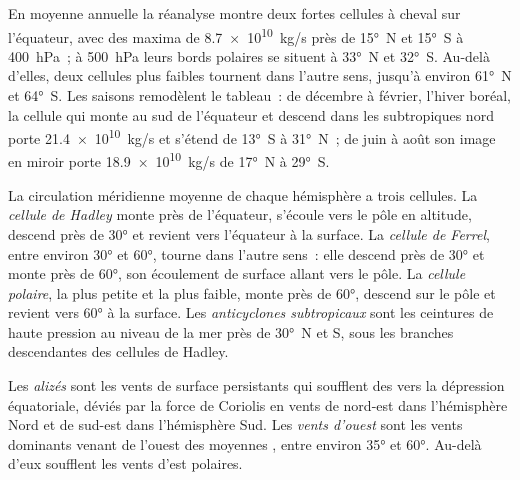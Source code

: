 En moyenne annuelle la réanalyse montre deux fortes cellules à cheval sur l'équateur, avec
des maxima de \qty{8.7e10}{kg/s} près de \ang{15}~N et \ang{15}~S à \qty{400}{hPa}~; à
\qty{500}{hPa} leurs bords polaires se situent à \ang{33}~N et \ang{32}~S. Au-delà
d'elles, deux cellules plus faibles tournent dans l'autre sens, jusqu'à environ \ang{61}~N et \ang{64}~S.
Les saisons remodèlent le tableau~: de décembre à février, l'hiver boréal, la
cellule qui monte au sud de l'équateur et descend dans les subtropiques nord porte
\qty{21.4e10}{kg/s} et s'étend de \ang{13}~S à \ang{31}~N~; de juin à août
son image en miroir porte \qty{18.9e10}{kg/s} de \ang{17}~N à \ang{29}~S.

\begin{definition}\label{def:b1:atmospheric-circulation:cells}
La circulation méridienne moyenne de chaque hémisphère a trois cellules. La \emph{cellule de
Hadley} monte près de l'équateur, s'écoule vers le pôle en altitude, descend près de
\ang{30} et revient vers l'équateur à la surface. La \emph{cellule de Ferrel}, entre environ \ang{30} et \ang{60}, tourne dans l'autre sens~:
elle descend près de \ang{30} et monte près de \ang{60}, son écoulement de surface allant vers le pôle. La
\emph{cellule polaire}, la plus petite et la plus faible, monte près de \ang{60},
descend sur le pôle et revient vers \ang{60} à la surface. Les
\emph{anticyclones subtropicaux} sont les ceintures de haute
pression au niveau de la mer près de \ang{30}~N et S, sous les branches descendantes des cellules de Hadley.
\end{definition}

\begin{definition}\label{def:b1:atmospheric-circulation:winds}
Les \emph{alizés} sont les vents de surface persistants qui soufflent
des  vers la dépression équatoriale, déviés par la force de Coriolis
en vents de nord-est dans l'hémisphère Nord et de sud-est dans l'hémisphère
Sud. Les \emph{vents d'ouest} sont les vents dominants venant de
l'ouest des moyennes , entre environ \ang{35} et \ang{60}. Au-delà d'eux soufflent
les vents d'est polaires.
\end{definition}

